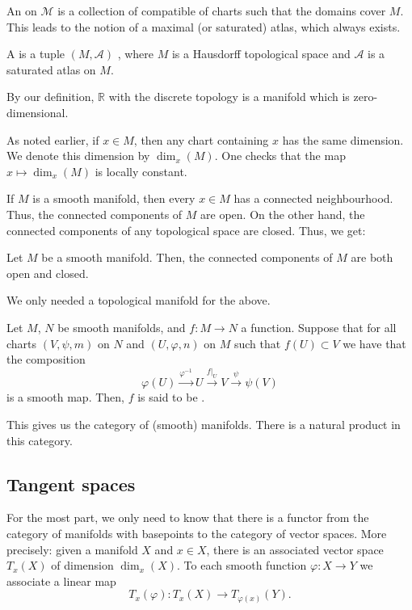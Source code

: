 \documentclass[12pt]{article}
\begin{document}
An  on $\mathcal{M}$ is a collection of compatible of charts such that the domains cover $M$. 
This leads to the notion of a maximal (or saturated) atlas, which always exists. 

\begin{defn}
	A  is a tuple $(M, \mathcal{A})$ , where $M$ is a Hausdorff topological space and $\mathcal{A}$ is a saturated atlas on $M$.
\end{defn}
By our definition, $\mathbb{R}$ with the discrete topology is a manifold which is zero-dimensional.

As noted earlier, if $x \in M$, then any chart containing $x$ has the same dimension. 
We denote this dimension by $\dim_{x}(M)$. 
One checks that the map $x \mapsto \dim_{x}(M)$ is locally constant. 

If $M$ is a smooth manifold, then every $x \in M$ has a connected neighbourhood. 
Thus, the connected components of $M$ are open. 
On the other hand, the connected components of any topological space are closed. Thus, we get:

\begin{thm} \label{thm:manifold-components-clopen}
	Let $M$ be a smooth manifold. Then, the connected components of $M$ are both open and closed.
\end{thm}
We only needed a topological manifold for the above.

Let $M$, $N$ be smooth manifolds, and $f \colon M \to N$ a function. 
Suppose that for all charts $(V, \psi, m)$ on $N$ and $(U, \varphi, n)$ on $M$ such that $f(U) \subset V$ we have that the composition
\begin{equation*} 
	\varphi(U) \xrightarrow{\varphi^{-1}} U \xrightarrow{f|_{U}} V \xrightarrow{\psi} \psi(V)
\end{equation*}
is a smooth map. 
Then, $f$ is said to be .

This gives us the category of (smooth) manifolds. There is a natural product in this category. 

\subsection{Tangent spaces} \label{subsec:tangent-spaces}

For the most part, we only need to know that there is a functor from the category of manifolds with basepoints to the category of vector spaces. 
More precisely: given a manifold $X$ and $x \in X$, there is an associated vector space $T_{x}(X)$ of dimension $\dim_{x}(X)$. 
To each smooth function $\varphi \colon X \to Y$ we associate a linear map
\begin{equation*} 
	T_{x}(\varphi) \colon T_{x}(X) \to T_{\varphi(x)}(Y).
\end{equation*}
\end{document}
